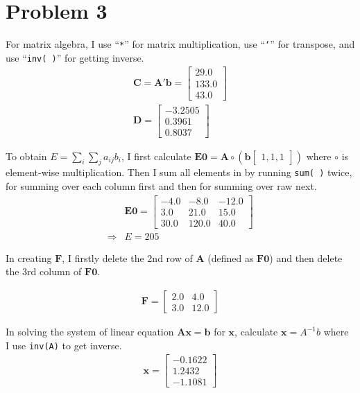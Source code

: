 \documentclass[11pt,letter]{article}
\newcommand{\vect}[1]{\boldsymbol{\mathbf{#1}}}
\newcounter{lem}[section] \setcounter{lem}{0}
\newcommand{\prn}[1]{\left({#1}\right)}
\newcommand{\bmat}[1]{\begin{bmatrix} #1 \end{bmatrix}}%
\newcommand{\code}[1]{\texttt{#1}}
\begin{document}
\section*{Problem 3}

For matrix algebra, I use ``\code{*}'' for matrix multiplication, use ``\code{`}'' for transpose, and use ``\code{inv( )}'' for getting inverse. 
\begin{align*}
\vect{C} = \vect{A}'\vect{b} = \left[\begin{array}{r} 29.0\\ 133.0\\ 43.0 \end{array}\right]\\
\vect{D} = \left[\begin{array}{r} -3.2505\\ 0.3961\\ 0.8037 \end{array}\right]
\end{align*}

To obtain ${E} =\sum_i \sum_j a_{ij} b_{i}$, I first calculate $\vect{E0} = \vect{A} \circ \prn{\vect{b}\bmat{1,1,1}}$ where $\circ$ is element-wise multiplication. Then I sum all elements in \vect{E0} by running \code{sum( )} twice, for summing over each column first and then for summing over raw next.
\begin{align*}
&\vect{E0} = \left[\begin{array}{rrr} -4.0 & -8.0 & -12.0\\ 3.0 & 21.0 & 15.0\\ 30.0 & 120.0 & 40.0 \end{array}\right]\\
\Rightarrow &E = 205
\end{align*}

In creating $\vect{F}$, I firstly delete the 2nd row of $\vect{A}$ (defined as $\vect{F0}$) and then delete the 3rd column of $\vect{F0}$. 

\begin{align*}
\vect{F} = \left[\begin{array}{rr} 2.0 & 4.0\\ 3.0 & 12.0 \end{array}\right]
\end{align*}

In solving the system of linear equation $\vect{A}\vect{x} = \vect{b}$ for $\vect{x}$, calculate $\vect{x} = A^{-1}b$ where I use \code{inv(A)} to get inverse. 
\begin{align*}
\vect{x} = \left[\begin{array}{r} -0.1622\\ 1.2432\\ -1.1081 \end{array}\right]
\end{align*}
\end{document}
